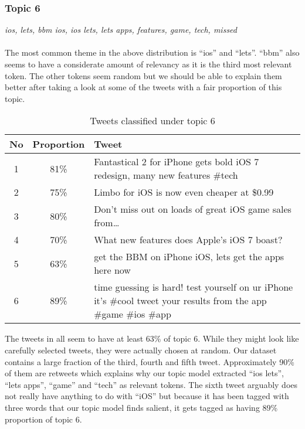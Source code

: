 \subsubsection{Topic 6}
\label{sec:topic_6}
\textit{ios, lets, bbm ios, ios lets, lets apps, features, game, tech, missed} \\\\
The most common theme in the above distribution is ``ios'' and ``lets''. ``bbm'' also seems to have
a considerate amount of relevancy as it is the third most relevant token. The other tokens seem
random but we should be able to explain them better after taking a look at some of the tweets with a
fair proportion of this topic.

\begin{table}[H]
  \begin{tabular}{c c p{13cm}} \toprule
    No & Proportion & Tweet \\ \midrule
    1  & 81\%       & Fantastical 2 for iPhone gets bold iOS 7 redesign, many new features \#tech \\ \midrule
    2  & 75\%       & Limbo for iOS is now even cheaper at \$0.99 \\ \midrule
    3  & 80\%       & Don't miss out on loads of great iOS game sales from\ldots \\ \midrule
    4  & 70\%       & What new features does Apple's iOS 7 boast? \\ \midrule
    5  & 63\%       & get the BBM on iPhone iOS, lets get the apps here now \\ \midrule
    6  & 89\%       & time guessing is hard! test yourself on ur iPhone it's \#cool tweet your
    results from the app \#game \#ios \#app \\ \bottomrule
  \end{tabular}
  \caption{Tweets classified under topic 6}
  \label{tab:tweets_under_6}
\end{table}

The tweets in  all seem to have at least 63\% of topic 6. While they
might look like carefully selected tweets, they were actually chosen at random. Our dataset contains
a large fraction of the third, fourth and fifth tweet. Approximately 90\% of them are retweets which
explains why our topic model extracted ``ios lets'', ``lets apps'', ``game'' and ``tech'' as
relevant tokens. The sixth tweet arguably does not really have anything to do with ``iOS'' but
because it has been tagged with three words that our topic model finds salient, it gets tagged as
having 89\% proportion of topic 6.



